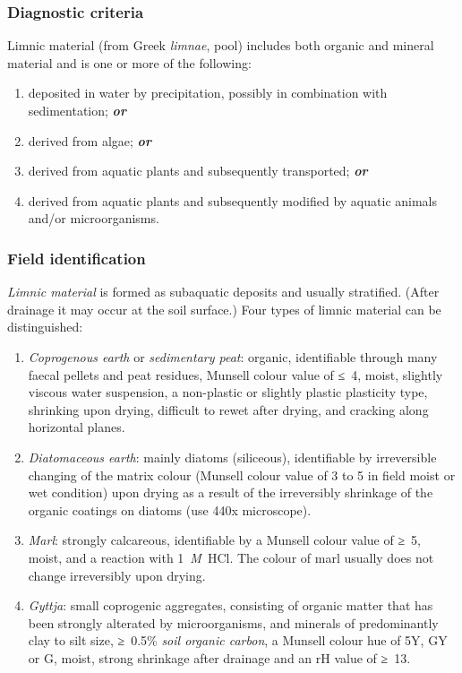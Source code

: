 \documentclass[
  letterpaper,
  DIV=11,
  numbers=noendperiod]{scrreprt}
\providecommand{\tightlist}{%
  \setlength{\itemsep}{0pt}\setlength{\parskip}{0pt}}\usepackage{longtable,booktabs,array}
\begin{document}
\hypertarget{diagnostic-criteria-66}{%
\subsubsection{Diagnostic criteria}\label{diagnostic-criteria-66}}

Limnic material (from Greek \emph{limnae}, pool) includes both organic
and mineral material and is one or more of the following:

\begin{enumerate}
\def\labelenumi{\arabic{enumi}.}
\tightlist
\item
  deposited in water by precipitation, possibly in combination with
  sedimentation; \textbf{\emph{or}}
\item
  derived from algae; \textbf{\emph{or}}
\item
  derived from aquatic plants and subsequently transported;
  \textbf{\emph{or}}
\item
  derived from aquatic plants and subsequently modified by aquatic
  animals and/or microorganisms.
\end{enumerate}

\hypertarget{field-identification-45}{%
\subsubsection{Field identification}\label{field-identification-45}}

\emph{Limnic material} is formed as subaquatic deposits and usually
stratified. (After drainage it may occur at the soil surface.) Four
types of limnic material can be distinguished:

\begin{enumerate}
\def\labelenumi{\arabic{enumi}.}
\item
  \emph{Coprogenous earth} or \emph{sedimentary peat}: organic,
  identifiable through many faecal pellets and peat residues, Munsell
  colour value of ≤~4, moist, slightly viscous water suspension, a
  non-plastic or slightly plastic plasticity type, shrinking upon
  drying, difficult to rewet after drying, and cracking along horizontal
  planes.
\item
  \emph{Diatomaceous earth}: mainly diatoms (siliceous), identifiable by
  irreversible changing of the matrix colour (Munsell colour value of 3
  to 5 in field moist or wet condition) upon drying as a result of the
  irreversibly shrinkage of the organic coatings on diatoms (use 440x
  microscope).
\item
  \emph{Marl}: strongly calcareous, identifiable by a Munsell colour
  value of ≥~5, moist, and a reaction with 1~\emph{M}~HCl. The colour of
  marl usually does not change irreversibly upon drying.
\item
  \emph{Gyttja}: small coprogenic aggregates, consisting of organic
  matter that has been strongly alterated by microorganisms, and
  minerals of predominantly clay to silt size, ≥~0.5\% \emph{soil
  organic carbon}, a Munsell colour hue of 5Y, GY or G, moist, strong
  shrinkage after drainage and an rH value of ≥~13.
\end{enumerate}
\end{document}
